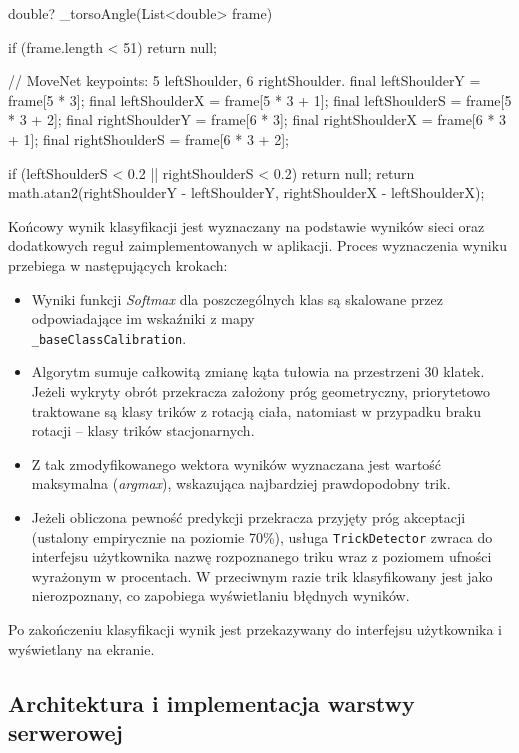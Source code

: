         \begin{code}[
                language=Dart,
                caption={Metoda \texttt{\_torsoAngle}.},
                label={lst:torsoAngle}
            ]
double? _torsoAngle(List<double> frame) {
if (frame.length < 51) return null;

// MoveNet keypoints: 5 leftShoulder, 6 rightShoulder.
final leftShoulderY = frame[5 * 3];
final leftShoulderX = frame[5 * 3 + 1];
final leftShoulderS = frame[5 * 3 + 2];
final rightShoulderY = frame[6 * 3];
final rightShoulderX = frame[6 * 3 + 1];
final rightShoulderS = frame[6 * 3 + 2];

if (leftShoulderS < 0.2 || rightShoulderS < 0.2) return null;
return math.atan2(rightShoulderY - leftShoulderY, 
rightShoulderX - leftShoulderX);
}\end{code}

            Końcowy wynik klasyfikacji jest wyznaczany na podstawie wyników sieci oraz dodatkowych reguł zaimplementowanych w aplikacji. Proces wyznaczenia wyniku przebiega w następujących krokach:
            \begin{itemize}
                \item Wyniki funkcji \textit{Softmax} dla poszczególnych klas są skalowane przez odpowiadające im wskaźniki z mapy \\\texttt{\_baseClassCalibration}.
                \item Algorytm sumuje całkowitą zmianę kąta tułowia na przestrzeni 30 klatek. Jeżeli wykryty obrót przekracza założony próg geometryczny, priorytetowo traktowane są klasy trików z rotacją ciała, natomiast w przypadku braku rotacji – klasy trików stacjonarnych.
                \item Z tak zmodyfikowanego wektora wyników wyznaczana jest wartość maksymalna (\textit{argmax}), wskazująca najbardziej prawdopodobny trik.
                \item Jeżeli obliczona pewność predykcji przekracza przyjęty próg akceptacji (ustalony empirycznie na poziomie 70\%), usługa \texttt{TrickDetector} zwraca do interfejsu użytkownika nazwę rozpoznanego triku wraz z poziomem ufności wyrażonym w procentach. W przeciwnym razie trik klasyfikowany jest jako nierozpoznany, co zapobiega wyświetlaniu błędnych wyników.
            \end{itemize}

            Po zakończeniu klasyfikacji wynik jest przekazywany do interfejsu użytkownika i wyświetlany na ekranie.

    \subsection{Architektura i implementacja warstwy serwerowej}


